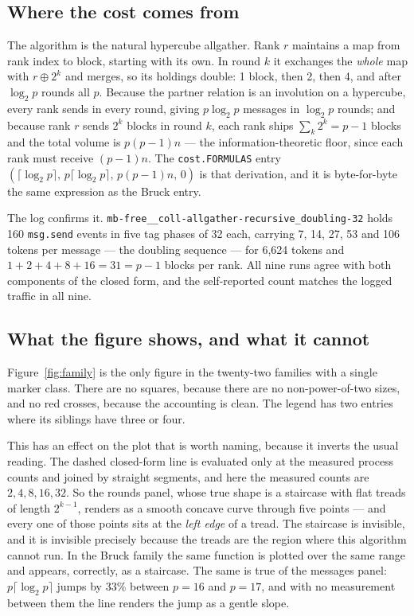 \documentclass[11pt]{article}
\begin{document}
\subsection{Where the cost comes from}

The algorithm is the natural hypercube allgather. Rank $r$ maintains a map from rank index to
block, starting with its own. In round $k$ it exchanges the \emph{whole} map with $r \oplus 2^k$
and merges, so its holdings double: 1 block, then 2, then 4, and after $\log_2 p$ rounds all $p$.
Because the partner relation is an involution on a hypercube, every rank sends in every round,
giving $p\log_2 p$ messages in $\log_2 p$ rounds; and because rank $r$ sends $2^k$ blocks in round
$k$, each rank ships $\sum_k 2^k = p-1$ blocks and the total volume is $p(p-1)n$ --- the
information-theoretic floor, since each rank must receive $(p-1)n$. The
\texttt{cost.FORMULAS} entry $(\lceil\log_2 p\rceil,\, p\lceil\log_2 p\rceil,\, p(p-1)n,\, 0)$ is
that derivation, and it is byte-for-byte the same expression as the Bruck entry.

The log confirms it. \texttt{mb-free\_\_coll-allgather-recursive\_doubling-32} holds 160
\texttt{msg.send} events in five tag phases of 32 each, carrying 7, 14, 27, 53 and 106 tokens per
message --- the doubling sequence --- for 6{,}624 tokens and $1+2+4+8+16 = 31 = p-1$ blocks per
rank. All nine runs agree with both components of the closed form, and the self-reported count
matches the logged traffic in all nine.

\subsection{What the figure shows, and what it cannot}

Figure~\ref{fig:family} is the only figure in the twenty-two families with a single marker class.
There are no squares, because there are no non-power-of-two sizes, and no red crosses, because the
accounting is clean. The legend has two entries where its siblings have three or four.

This has an effect on the plot that is worth naming, because it inverts the usual reading. The
dashed closed-form line is evaluated only at the measured process counts and joined by straight
segments, and here the measured counts are $2, 4, 8, 16, 32$. So the rounds panel, whose true
shape is a staircase with flat treads of length $2^{k-1}$, renders as a smooth concave curve
through five points --- and every one of those points sits at the \emph{left edge} of a tread. The
staircase is invisible, and it is invisible precisely because the treads are the region where this
algorithm cannot run. In the Bruck family the same function is plotted over the same range and
appears, correctly, as a staircase. The same is true of the messages panel: $p\lceil\log_2 p\rceil$
jumps by 33\% between $p=16$ and $p=17$, and with no measurement between them the line renders the
jump as a gentle slope.
\end{document}
